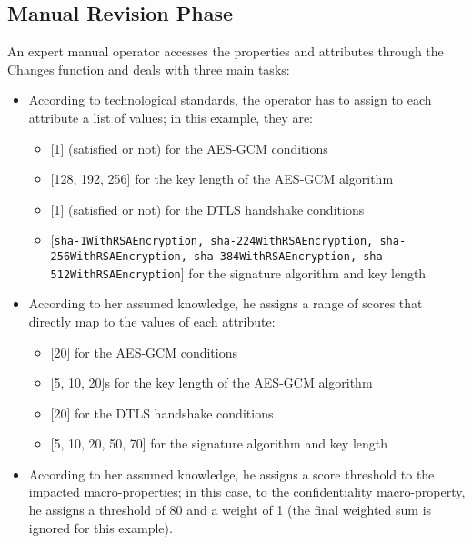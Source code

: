 \subsection{Manual Revision Phase}
An expert manual operator accesses the properties and attributes through the Changes function and deals with three main tasks:
\begin{itemize}
    \item According to technological standards, the operator has to assign to each attribute a list of values; in this example, they are:
    \begin{itemize}
        \item {[1]} (satisfied or not) for the AES-GCM conditions
        \item {[128, 192, 256]} for the key length of the AES-GCM algorithm
        \item {[1]} (satisfied or not) for the DTLS handshake conditions
        \item {[\texttt{sha-1WithRSAEncryption, sha-224WithRSAEncryption, sha-256WithRSAEncryption, sha-384WithRSAEncryption, sha-512WithRSAEncryption}]} for the signature algorithm and key length
    \end{itemize}
    
    \item According to her assumed knowledge, he assigns a range of scores that directly map to the values of each attribute:
    \begin{itemize}
        \item {[20]} for the AES-GCM conditions
        \item {[5, 10, 20]s} for the key length of the AES-GCM algorithm
        \item {[20]} for the DTLS handshake conditions
        \item {[5, 10, 20, 50, 70]} for the signature algorithm and key length
    \end{itemize}
    
    \item According to her assumed knowledge, he assigns a score threshold to the impacted macro-properties; in this case, to the confidentiality macro-property, he assigns a threshold of 80 and a weight of 1 (the final weighted sum is ignored for this example).
\end{itemize}

